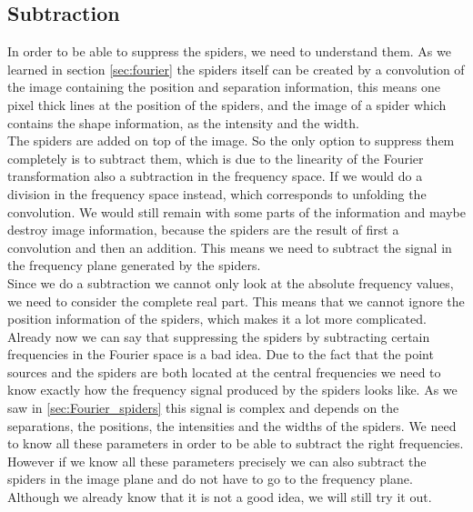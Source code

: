 \subsection{Subtraction}
In order to be able to suppress the spiders, we need to understand them. As we learned in section \ref{sec:fourier} the spiders itself can be created by a convolution of the image containing the position and separation information, this means one pixel thick lines at the position of the spiders, and the image of a spider which contains the shape information, as the intensity and the width.\\
The spiders are added on top of the image. So the only option to suppress them completely is to subtract them, which is due to the linearity of the Fourier transformation also a subtraction in the frequency space. If we would do a division in the frequency space instead, which corresponds to unfolding the convolution. We would still remain with some parts of the information and maybe destroy image information, because the spiders are the result of first a convolution and then an addition.  This means we need to subtract the signal in the frequency plane generated by the spiders.\\
Since we do a subtraction we cannot only look at the absolute frequency values, we need to consider the complete real part. This means that we cannot ignore the position information of the spiders, which makes it a lot more complicated. Already now we can say that suppressing the spiders by subtracting certain frequencies in the Fourier space is a bad idea. Due to the fact that the point sources and the spiders are both located at the central frequencies we need to know exactly how the frequency signal produced by the spiders looks like. As we saw in \ref{sec:Fourier_spiders} this signal is complex and depends on the separations, the positions, the intensities and the widths of the spiders. We need to know all these parameters in order to be able to subtract the right frequencies. However if we know all these parameters precisely we can also subtract the spiders in the image plane and do not have to go to the frequency plane. Although we already know that it is not a good idea, we will still try it out. \\
